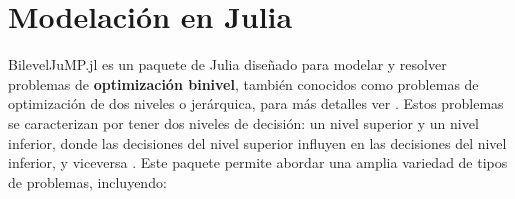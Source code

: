 \section{Modelación en Julia}
BilevelJuMP.jl es un paquete de Julia diseñado para modelar y resolver problemas de \textbf{optimización binivel}, también conocidos como problemas de optimización de dos niveles o jerárquica, para más detalles ver \cite{BilevelJump}.
Estos problemas se caracterizan por tener dos niveles de decisión: un nivel superior y un nivel inferior, donde las decisiones del nivel superior influyen en las decisiones del nivel inferior, y viceversa \cite{BilevelJump}.
Este paquete permite abordar una amplia variedad de tipos de problemas, incluyendo:

